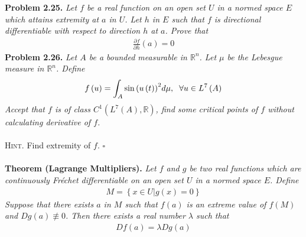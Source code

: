 \documentclass[a4paper]{article}
\numberwithin{equation}{section}
\begin{document}
\textbf{Problem 2.25.} \textit{Let $f$ be a real function on an open set $U$ in a normed space $E$ which attains extremity at $a$ in $U$. Let $h$ in $E$ such that $f$ is directional differentiable with respect to direction $h$ at $a$. Prove that}
\begin{align}
\frac{{\partial f}}{{\partial h}}\left( a \right) = 0
\end{align}
\textbf{Problem 2.26.} \textit{Let $A$ be a bounded measurable in $\mathbb{R}^n$. Let $\mu$ be the Lebesgue measure in $\mathbb{R}^n$. Define}
\begin{align}
f\left( u \right) = \int_A {\sin {{\left( {u\left( t \right)} \right)}^2}d\mu } ,\hspace{0.2cm}\forall u \in {L^7}\left( A \right)
\end{align}
\textit{Accept that $f$ is of class ${C^1}\left( {{L^7}\left( A \right),\mathbb{R}} \right)$, find some critical points of $f$ without calculating derivative of $f$.}\\
\\
\textsc{Hint.} Find extremity of $f$. \hfill $\square$\\
\\
\textbf{Theorem (Lagrange Multipliers).} \textit{Let $f$ and $g$ be two real functions which are continuously Fr\'{e}chet differentiable on an open set $U$ in a normed space $E$. Define}
\begin{align}
M = \left\{ {x \in U|g\left( x \right) = 0} \right\}
\end{align}
\textit{Suppose that there exists $a$ in $M$ such that $f\left(a\right)$ is an extreme value of $f\left(M\right)$ and $Dg\left( a \right)\not  \equiv 0$. Then there exists a real number $\lambda$ such that}
\begin{align}
Df\left( a \right) = \lambda Dg\left( a \right)
\end{align}
\end{document}

